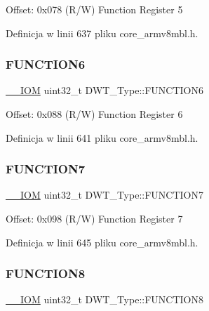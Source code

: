 Offset\+: 0x078 (R/W) Function Register 5 

Definicja w linii 637 pliku core\+\_\+armv8mbl.\+h.

\mbox{\label{struct_d_w_t___type_aa8f49a707a5d85cf554b9bef54c19380}} 
\subsubsection{\texorpdfstring{F\+U\+N\+C\+T\+I\+O\+N6}{FUNCTION6}}
{\footnotesize\ttfamily \hyperlink{core__sc300_8h_ab6caba5853a60a17e8e04499b52bf691}{\+\_\+\+\_\+\+I\+OM} uint32\+\_\+t D\+W\+T\+\_\+\+Type\+::\+F\+U\+N\+C\+T\+I\+O\+N6}

Offset\+: 0x088 (R/W) Function Register 6 

Definicja w linii 641 pliku core\+\_\+armv8mbl.\+h.

\mbox{\label{struct_d_w_t___type_ababf5d870650c4a480302b65bdb66741}} 
\subsubsection{\texorpdfstring{F\+U\+N\+C\+T\+I\+O\+N7}{FUNCTION7}}
{\footnotesize\ttfamily \hyperlink{core__sc300_8h_ab6caba5853a60a17e8e04499b52bf691}{\+\_\+\+\_\+\+I\+OM} uint32\+\_\+t D\+W\+T\+\_\+\+Type\+::\+F\+U\+N\+C\+T\+I\+O\+N7}

Offset\+: 0x098 (R/W) Function Register 7 

Definicja w linii 645 pliku core\+\_\+armv8mbl.\+h.

\mbox{\label{struct_d_w_t___type_acdd6b87ea4bc95345687074c53098e75}} 
\subsubsection{\texorpdfstring{F\+U\+N\+C\+T\+I\+O\+N8}{FUNCTION8}}
{\footnotesize\ttfamily \hyperlink{core__sc300_8h_ab6caba5853a60a17e8e04499b52bf691}{\+\_\+\+\_\+\+I\+OM} uint32\+\_\+t D\+W\+T\+\_\+\+Type\+::\+F\+U\+N\+C\+T\+I\+O\+N8}

